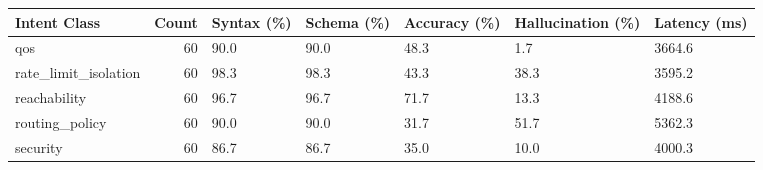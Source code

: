 \begin{tabular}{lrlllll}
\toprule
Intent Class & Count & Syntax (\%) & Schema (\%) & Accuracy (\%) & Hallucination (\%) & Latency (ms) \\
\midrule
qos & 60 & 90.0 & 90.0 & 48.3 & 1.7 & 3664.6 \\
rate_limit_isolation & 60 & 98.3 & 98.3 & 43.3 & 38.3 & 3595.2 \\
reachability & 60 & 96.7 & 96.7 & 71.7 & 13.3 & 4188.6 \\
routing_policy & 60 & 90.0 & 90.0 & 31.7 & 51.7 & 5362.3 \\
security & 60 & 86.7 & 86.7 & 35.0 & 10.0 & 4000.3 \\
\bottomrule
\end{tabular}
